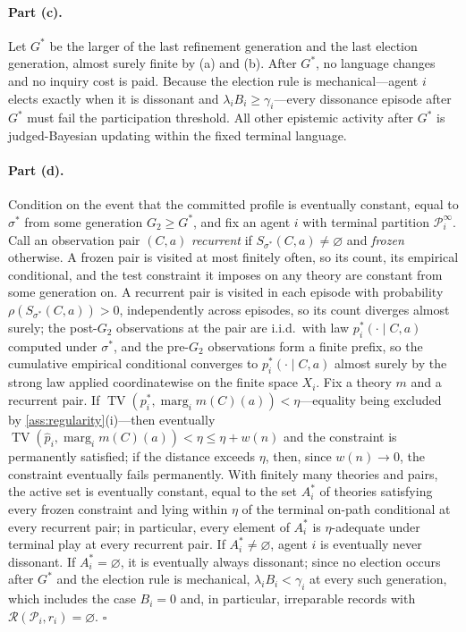 \documentclass[11pt]{article}
\theoremstyle{definition}
\newcommand{\emptysetset}{\varnothing}
\newcommand{\TV}{\operatorname{TV}}
\newcommand{\marg}[1]{\operatorname{marg}_{#1}}
\begin{document}
\paragraph{Part (c).}
Let $G^{*}$ be the larger of the last refinement generation and the last
election generation, almost surely finite by (a) and (b).  After $G^{*}$,
no language changes and no inquiry cost is paid.  Because the election rule
is mechanical---agent $i$ elects exactly when it is dissonant and
$\lambda_iB_i\geq\gamma_i$---every dissonance episode after $G^{*}$ must
fail the participation threshold.  All other epistemic activity after
$G^{*}$ is judged-Bayesian updating within the fixed terminal language.

\paragraph{Part (d).}
Condition on the event that the committed profile is eventually constant,
equal to $\sigma^{*}$ from some generation $G_2\geq G^{*}$, and fix an
agent $i$ with terminal partition $\mathcal P_i^{\infty}$.  Call an
observation pair $(C,a)$ \emph{recurrent} if
$S_{\sigma^{*}}(C,a)\neq\emptysetset$ and \emph{frozen} otherwise.  A frozen
pair is visited at most finitely often, so its count, its empirical
conditional, and the test constraint it imposes on any theory are constant
from some generation on.  A recurrent pair is visited in each episode with
probability $\rho(S_{\sigma^{*}}(C,a))>0$, independently across episodes, so
its count diverges almost surely; the post-$G_2$ observations at the pair
are i.i.d.\ with law $p_i^{*}(\cdot\mid C,a)$ computed under $\sigma^{*}$,
and the pre-$G_2$ observations form a finite prefix, so the cumulative
empirical conditional converges to $p_i^{*}(\cdot\mid C,a)$ almost surely
by the strong law applied coordinatewise on the finite space $X_i$.  Fix a
theory $m$ and a recurrent pair.  If
$\TV(p_i^{*},\marg{i}m(C)(a))<\eta$---equality being excluded by
\cref{ass:regularity}(i)---then eventually
$\TV(\hat p_i,\marg{i}m(C)(a))<\eta\leq\eta+w(n)$ and the constraint is
permanently satisfied; if the distance exceeds $\eta$, then, since
$w(n)\to0$, the constraint eventually fails permanently.  With finitely
many theories and pairs, the active set is eventually constant, equal to
the set $A_i^{*}$ of theories satisfying every frozen constraint and lying
within $\eta$ of the terminal on-path conditional at every recurrent pair;
in particular, every element of $A_i^{*}$ is $\eta$-adequate under terminal
play at every recurrent pair.  If $A_i^{*}\neq\emptysetset$, agent $i$ is
eventually never dissonant.  If $A_i^{*}=\emptysetset$, it is eventually
always dissonant; since no election occurs after $G^{*}$ and the election
rule is mechanical, $\lambda_iB_i<\gamma_i$ at every such generation, which
includes the case $B_i=0$ and, in particular, irreparable records with
$\mathcal R(\mathcal P_i,r_i)=\emptysetset$.  \hfill$\square$
\end{document}

